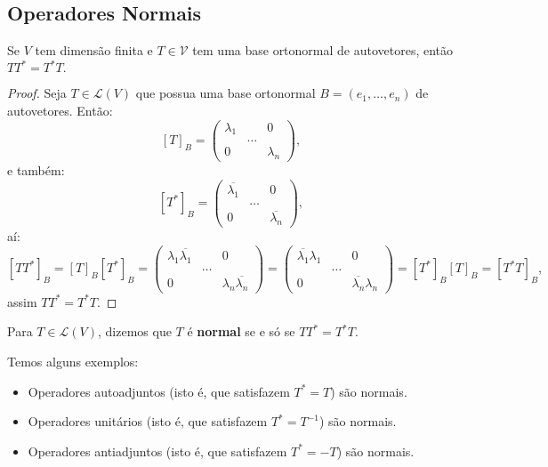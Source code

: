 \documentclass[11pt,twoside,a4paper]{book}
\begin{document}
\subsection{Operadores Normais}

\begin{proposicao}
Se $V$ tem dimensão finita e $T\in\mathcal{V}$ tem uma base ortonormal de autovetores, então $TT^*=T^*T.$
\end{proposicao}
\begin{proof}
Seja $T\in\mathcal{L}(V)$ que possua uma base ortonormal $B=(e_1,\dots,e_n)$ de autovetores. Então:
\[
[T]_B=\begin{pmatrix}
\lambda_1&&0\\&\dots&\\0&&\lambda_n
\end{pmatrix},
\]
e também:
\[
[T^*]_B=\begin{pmatrix}
\overline{\lambda_1}&&0\\&\dots&\\0&&\overline{\lambda_n}
\end{pmatrix},
\]
aí:
\[
[TT^*]_B=[T]_B[T^*]_B=\begin{pmatrix}
\lambda_1\overline{\lambda_1}&&0\\&\dots&\\0&&\lambda_n\overline{\lambda_n}
\end{pmatrix}=\begin{pmatrix}
\overline{\lambda_1}\lambda_1&&0\\&\dots&\\0&&\overline{\lambda_n}\lambda_n
\end{pmatrix}=[T^*]_B[T]_B=[T^*T]_B,
\]
assim $TT^*=T^*T$.
\end{proof}

\begin{definicao}
Para $T\in\mathcal{L}(V)$, dizemos que $T$ é \textbf{normal} se e só se $TT^*=T^*T$.
\end{definicao}

\begin{exemplo}
Temos alguns exemplos:
\begin{itemize}
\item Operadores autoadjuntos (isto é, que satisfazem $T^*=T$) são normais.
\item Operadores unitários (isto é, que satisfazem $T^*=T^{-1}$) são normais.
\item Operadores antiadjuntos (isto é, que satisfazem $T^*=-T$) são normais.
\end{itemize}
\end{exemplo}
\end{document}
